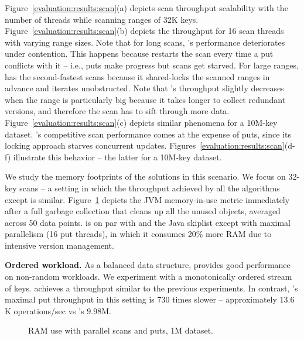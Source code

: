 Figure~\ref{evaluation:results:scan}(a) depicts scan throughput scalability with the number of threads
while scanning ranges of 32K keys. Figure~\ref{evaluation:results:scan}(b) depicts the throughput for 16 scan 
threads with varying range sizes. Note that for long scans, {\kary}'s performance deteriorates under contention. 
This happens because {\kary} restarts the scan every time a put conflicts with it -- i.e., puts make progress 
but scans get starved. For large ranges, {\snaptree} has the second-fastest scans because it shared-locks 
the scanned ranges in advance and iterates unobstructed. 
Note that {\kiwi}'s throughput slightly decreases when the range is particularly big 
because it takes longer to collect redundant versions, and therefore the scan has to sift through 
more data. Figure~\ref{evaluation:results:scan}(c) depicts similar phenomena for a 10M-key dataset.
%
{\snaptree}'s competitive scan performance comes at the expense of puts, 
since its locking approach starves concurrent updates. Figures~\ref{evaluation:results:scan}(d-f) 
 illustrate this behavior -- the latter for a 10M-key dataset.

We study the memory footprints of the solutions in this scenario. We focus on 32-key scans -- a setting 
in which the throughput achieved by all the algorithms except {\snaptree} is similar.  
Figure~\ref{evaluation:results:mem} depicts the JVM memory-in-use metric immediately after a full 
garbage collection that cleans up all the unused objects, averaged across 50 data points. 
{\kiwi} is on par with {\kary} and the Java skiplist except with maximal parallelism (16 put threads), 
in which it consumes 20\% more RAM due to intensive version management.  



\textbf{Ordered workload.} 
As a balanced data structure, {\kiwi} provides good performance on non-random workloads. 
We experiment with a monotonically ordered stream of keys. {\kiwi} achieves a throughput 
similar to the previous experiments. In contrast, {\kary}'s maximal put throughput in this setting is 
730 times slower -- approximately $13.6$K operations/sec vs {\kiwi}'s $9.98$M. 

\begin{figure}
\begin{center}

\end{center}
\caption{RAM use with parallel scans and puts, 1M dataset. }
\label{evaluation:results:mem}
\vskip -10pt
\end{figure}